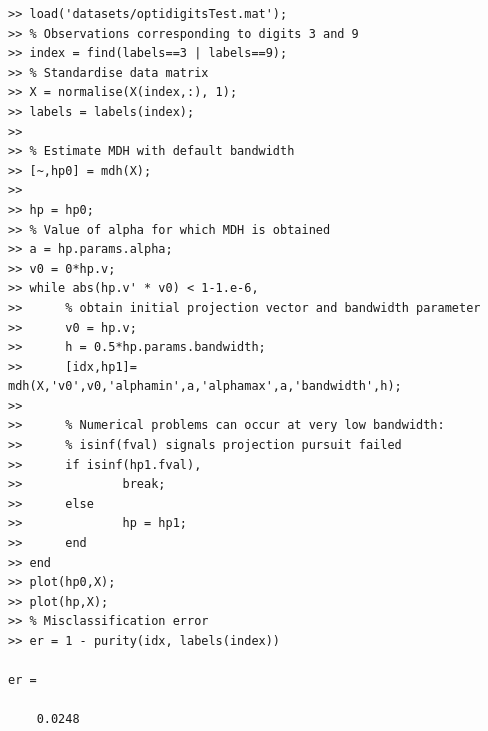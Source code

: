 \documentclass{book}
\begin{document}
\begin{lstlisting}
>> load('datasets/optidigitsTest.mat');
>> % Observations corresponding to digits 3 and 9
>> index = find(labels==3 | labels==9);
>> % Standardise data matrix
>> X = normalise(X(index,:), 1);
>> labels = labels(index);
>> 
>> % Estimate MDH with default bandwidth
>> [~,hp0] = mdh(X);
>> 
>> hp = hp0;
>> % Value of alpha for which MDH is obtained
>> a = hp.params.alpha;
>> v0 = 0*hp.v;
>> while abs(hp.v' * v0) < 1-1.e-6,
>>      % obtain initial projection vector and bandwidth parameter
>>      v0 = hp.v;
>>      h = 0.5*hp.params.bandwidth;
>>      [idx,hp1]= mdh(X,'v0',v0,'alphamin',a,'alphamax',a,'bandwidth',h);
>>
>>      % Numerical problems can occur at very low bandwidth:
>>      % isinf(fval) signals projection pursuit failed 
>>      if isinf(hp1.fval),
>>              break;
>>      else
>>              hp = hp1;
>>      end
>> end
>> plot(hp0,X);
>> plot(hp,X);
>> % Misclassification error
>> er = 1 - purity(idx, labels(index))

er =

    0.0248

\end{lstlisting}
\end{document}
